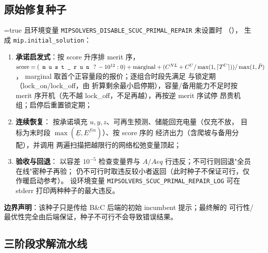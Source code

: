 \subsection{原始修复种子}
\label{sec:impl-repair}

=true 且环境变量
\texttt{MIPSOLVERS\_DISABLE\_SCUC\_PRIMAL\_REPAIR} 未设置时
（），
 生成
\texttt{mip.initial\_solution}：

\begin{enumerate}
  \item \textbf{承诺启发式}：按 score 升序排 merit 序，
        $\mathrm{score}=(\fld{must\_run}\,?\,-10^{12}:0)+\mathrm{marginal}
        +(C^{NL}+C^U/\max(1,\lceil T^U\rceil))/\max(1,\bar P)$，
        marginal 取首个正容量段的报价；逐组合时段先满足
         与锁定期（lock\_on/lock\_off，由
         折算剩余最小启停期），容量/备用能力不足时按
        merit 序开机（先不越 lock\_off，不足再越），再按逆 merit 序试停
        昂贵机组；启停后重置锁定期；
  \item \textbf{连续恢复}：
        按承诺填充 $u,y,z$、可再生预测、储能回充电量（仅充不放，
        目标为末时段 $\max(\underline E,E^{fin})$）、按 score 序的
        经济出力（含爬坡与备用分配），并调用
        两遍扫描把越限行的网络松弛变量顶起；
  \item \textbf{验收与回退}：
         以容差 $10^{-5}$
        检查变量界与 $A/Aeq$ 行违反；不可行则回退"全员在线"密种子再验；
        仍不可行时取违反较小者返回（此时种子不保证可行，仅作暖启动参考）。
        设环境变量 \texttt{MIPSOLVERS\_SCUC\_PRIMAL\_REPAIR\_LOG} 可在
        stderr 打印两种种子的最大违反。
\end{enumerate}

\textbf{边界声明}：该种子只是传给 B\&C 后端的初始 incumbent 提示；最终解的
可行性/最优性完全由后端保证，种子不可行不会导致错误结果。

\subsection{三阶段求解流水线}

